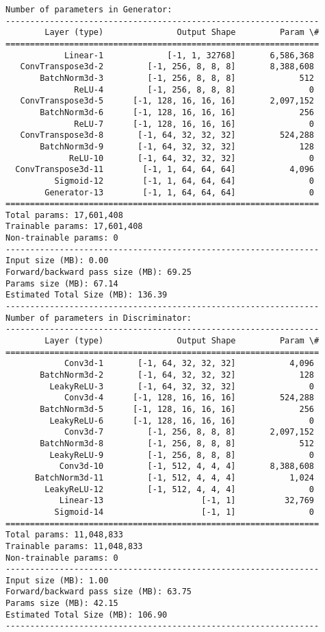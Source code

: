 \documentclass[11pt]{article}
\begin{document}
    \begin{Verbatim}[commandchars=\\\{\}]
Number of parameters in Generator:
----------------------------------------------------------------
        Layer (type)               Output Shape         Param \#
================================================================
            Linear-1             [-1, 1, 32768]       6,586,368
   ConvTranspose3d-2         [-1, 256, 8, 8, 8]       8,388,608
       BatchNorm3d-3         [-1, 256, 8, 8, 8]             512
              ReLU-4         [-1, 256, 8, 8, 8]               0
   ConvTranspose3d-5      [-1, 128, 16, 16, 16]       2,097,152
       BatchNorm3d-6      [-1, 128, 16, 16, 16]             256
              ReLU-7      [-1, 128, 16, 16, 16]               0
   ConvTranspose3d-8       [-1, 64, 32, 32, 32]         524,288
       BatchNorm3d-9       [-1, 64, 32, 32, 32]             128
             ReLU-10       [-1, 64, 32, 32, 32]               0
  ConvTranspose3d-11        [-1, 1, 64, 64, 64]           4,096
          Sigmoid-12        [-1, 1, 64, 64, 64]               0
        Generator-13        [-1, 1, 64, 64, 64]               0
================================================================
Total params: 17,601,408
Trainable params: 17,601,408
Non-trainable params: 0
----------------------------------------------------------------
Input size (MB): 0.00
Forward/backward pass size (MB): 69.25
Params size (MB): 67.14
Estimated Total Size (MB): 136.39
----------------------------------------------------------------
Number of parameters in Discriminator:
----------------------------------------------------------------
        Layer (type)               Output Shape         Param \#
================================================================
            Conv3d-1       [-1, 64, 32, 32, 32]           4,096
       BatchNorm3d-2       [-1, 64, 32, 32, 32]             128
         LeakyReLU-3       [-1, 64, 32, 32, 32]               0
            Conv3d-4      [-1, 128, 16, 16, 16]         524,288
       BatchNorm3d-5      [-1, 128, 16, 16, 16]             256
         LeakyReLU-6      [-1, 128, 16, 16, 16]               0
            Conv3d-7         [-1, 256, 8, 8, 8]       2,097,152
       BatchNorm3d-8         [-1, 256, 8, 8, 8]             512
         LeakyReLU-9         [-1, 256, 8, 8, 8]               0
           Conv3d-10         [-1, 512, 4, 4, 4]       8,388,608
      BatchNorm3d-11         [-1, 512, 4, 4, 4]           1,024
        LeakyReLU-12         [-1, 512, 4, 4, 4]               0
           Linear-13                    [-1, 1]          32,769
          Sigmoid-14                    [-1, 1]               0
================================================================
Total params: 11,048,833
Trainable params: 11,048,833
Non-trainable params: 0
----------------------------------------------------------------
Input size (MB): 1.00
Forward/backward pass size (MB): 63.75
Params size (MB): 42.15
Estimated Total Size (MB): 106.90
----------------------------------------------------------------
    \end{Verbatim}
\end{document}
